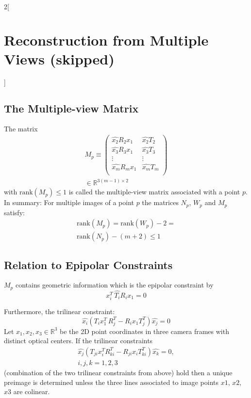 \documentclass[oneside,fontsize=11pt,paper=a4]{scrartcl}
\begin{document}
\begin{multicols}{2}[\section{Reconstruction from Multiple Views (skipped)}]
\subsection{The Multiple-view Matrix}
The matrix 
\begin{equation*}
\begin{split}
    M_p \equiv \begin{pmatrix}\hat{x_2}R_2x_1 & \hat{x_2}T_2\\ \hat{x_3}R_3x_1 & \hat{x_3}T_3\\ \vdots & \vdots\\ \hat{x_m}R_mx_1 & \hat{x_m}T_m\\ \end{pmatrix} \\ \in \mathbb{R}^{3(m-1) \times 2}
\end{split}
\end{equation*}
with $\text{rank}(M_p) \leq 1$ is called the multiple-view matrix associated with a point $p$.\\
In summary: For multiple images of a point $p$ the matrices $N_p$, $W_p$ and $M_p$ satisfy:
\begin{equation*}
\begin{split}
    \text{rank}(M_p) = \text{rank}(W_p) -2 = \\ \text{rank}(N_p) - (m +2) \leq 1
\end{split}
\end{equation*}

\subsection{Relation to Epipolar Constraints}
$M_p$ contains geometric information which is the epipolar constraint by \begin{equation*}
    x_i^T \, \hat{T_i} R_i x_1 = 0
\end{equation*}

Furthermore, the trilinear constraint: 
\begin{equation*}
    \hat{x_i} (T_i x_1^T \, R_j^T - R_ix_1T_j^T)\hat{x_j} = 0
\end{equation*}
Let $x_1, x_2, x_3 \in \mathbb{R}^3$ be the 2D point coordinates in three camera frames with distinct optical centers. If the trilinear constraints
\begin{equation*}
\begin{split}
    \hat{x_j} \left(T_{ji} x_i^T R_{ki}^T - R_{ji} x_i T_{ki}^T \right) \hat{x_k} = 0, \\ i, j, k = 1, 2, 3
\end{split}
\end{equation*}
(combination of the two trilinear constraints from above) hold then a unique preimage is determined unless the three lines associated to image points $x1$, $x2$, $x3$ are colinear. 


\end{multicols}
\end{document}
